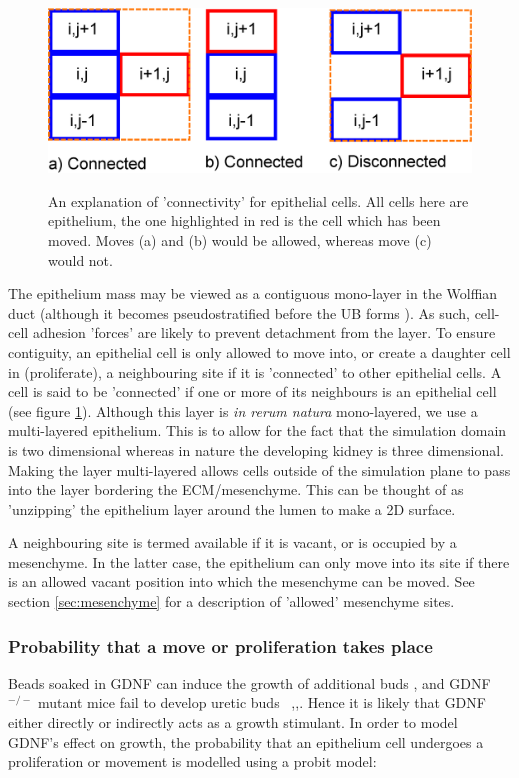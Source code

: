 \documentclass[pdftex,10pt,a4paper,twocolumn]{article}
\begin{document}
\begin{figure}[t] 
\centering
\scalebox{0.5} 
{\includegraphics{connected.eps}}
\caption{An explanation of 'connectivity' for epithelial cells. All cells here are epithelium, the one highlighted in red is the cell which has been moved. Moves (a) and (b) would be allowed, whereas move (c) would not.}\label{fig:connected}
\end{figure} 


The epithelium mass may be viewed as a contiguous mono-layer in the Wolffian duct (although it becomes pseudostratified before the UB forms \cite{Chi2009}). As such, cell-cell adhesion 'forces' are likely to prevent detachment from the layer. To ensure contiguity, an epithelial cell is only allowed to move into, or create a daughter cell in (proliferate), a neighbouring site if it is 'connected' to other epithelial cells. A cell is said to be 'connected' if one or more of its neighbours is an epithelial cell (see figure \ref{fig:connected}). Although this layer is \textit{in rerum natura} mono-layered, we use a multi-layered epithelium. This is to allow for the fact that the simulation domain is two dimensional whereas in nature the developing kidney is three dimensional. Making the layer multi-layered allows cells outside of the simulation plane to pass into the layer bordering the ECM/mesenchyme. This can be thought of as 'unzipping' the epithelium layer around the lumen to make a 2D surface.

A neighbouring site is termed available if it is vacant, or is occupied by a mesenchyme. In the latter case, the epithelium can only move into its site if there is an allowed vacant position into which the mesenchyme can be moved. See section \ref{sec:mesenchyme} for a description of 'allowed' mesenchyme sites.

\subsubsection{Probability that a move or proliferation takes place}\label{sec:prob}
Beads soaked in GDNF can induce the growth of additional buds \cite{pepicelli1997gdnf}, and GDNF$^{-/-}$ mutant mice fail to develop uretic buds ~\cite{CostantiniFKopan2010},\cite{majumdar2003wnt11},\cite{treanor1996characterization}. Hence it is likely that GDNF either directly or indirectly acts as a growth stimulant. In order to model GDNF's effect on growth, the probability that an epithelium cell undergoes a proliferation or movement is modelled using a probit model:
\end{document}
